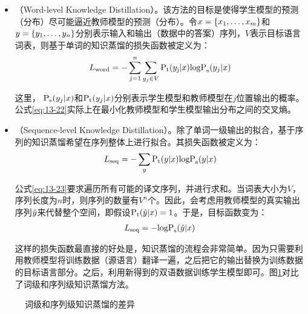 \begin{itemize}
\vspace{0.5em}
\item {\small{}}（Word-level Knowledge Distillation）。该方法的目标是使得学生模型的预测（分布）尽可能逼近教师模型的预测（分布）。令${x}=\{x_1,\ldots,x_m\}$和${y}=\{y_1,\ldots,y_n\}$分别表示输入和输出（数据中的答案）序列，$V$表示目标语言词表，则基于单词的知识蒸馏的损失函数被定义为：
\begin{eqnarray}
L_{\textrm{word}} = - \sum_{j=1}^n \sum_{y_j \in V} \textrm{P}_{\textrm{t}} (y_{\textrm{j}}|{x})\textrm{logP}_{\textrm{s}}(y_j|{x})
\label{eq:13-22}
\end{eqnarray}

这里， $\textrm{P}_{\textrm{s}}(y_j|{x})$和$\textrm{P}_{\textrm{t}} (y_j|{x})$分别表示学生模型和教师模型在$j$位置输出的概率。公式\eqref{eq:13-22}实际上在最小化教师模型和学生模型输出分布之间的交叉熵。
\vspace{0.5em}
\item {\small{}}（Sequence-level Knowledge Distillation）。除了单词一级输出的拟合，基于序列的知识蒸馏希望在序列整体上进行拟合。其损失函数被定义为：
\begin{eqnarray}
L_{\textrm{seq}} = - \sum_{{y}}\textrm{P}_{\textrm{t}} ({y}|{x})\textrm{logP}_{\textrm{s}}({y}|{x})
\label{eq:13-23}
\end{eqnarray}

公式\eqref{eq:13-23}要求遍历所有可能的译文序列，并进行求和。当词表大小为$V$，序列长度为$n$时，则序列的数量有$V^n$个。因此，会考虑用教师模型的真实输出序列$\hat{{y}}$来代替整个空间，即假设$\textrm{P}_{\textrm{t}}(\hat{{y}}|{x})=1$。于是，目标函数变为：
\begin{eqnarray}
L_{\textrm{seq}} = - \textrm{logP}_{\textrm{s}}(\hat{{y}} | {x})
\label{eq:13-24}
\end{eqnarray}

这样的损失函数最直接的好处是，知识蒸馏的流程会非常简单。因为只需要利用教师模型将训练数据（源语言）翻译一遍，之后把它的输出替换为训练数据的目标语言部分。之后，利用新得到的双语数据训练学生模型即可。图\ref{fig:13-12}对比了词级和序列级知识蒸馏方法。
\vspace{0.5em}
\end{itemize}

\begin{figure}[htp]
\centering

\caption{词级和序列级知识蒸馏的差异}
\label{fig:13-12}
\end{figure}

